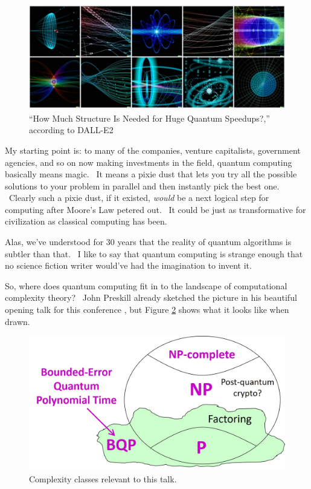 \documentclass[11pt]{article}
\begin{document}
\begin{figure}
\includegraphics[width=6.5in]{dalle.jpg}
\caption{``How Much Structure Is Needed for Huge Quantum Speedups?,'' according to DALL-E2}
\label{dalle}
\end{figure}

My starting point is: to many of the companies, venture capitalists, government agencies, and so on now making investments in the field, quantum computing basically means magic. \ It means a pixie dust that lets you try all the possible solutions to your problem in parallel and then instantly pick the best one. \ Clearly such a pixie dust, if it existed, \emph{would} be a next logical step for computing after Moore's Law petered out. \ It could be just as transformative for civilization as classical computing has been.

Alas, we've understood for 30 years that the reality of quantum algorithms is subtler than that. \ I like to say that quantum computing is strange enough that no science fiction writer would've had the imagination to invent it.

So, where does quantum computing fit in to the landscape of computational complexity theory? \ John Preskill already sketched the picture in his beautiful opening talk for this conference \cite{preskill:solvay}, but Figure \ref{classes} shows what it looks like when drawn.

\begin{figure}
\includegraphics[width=6.5in]{classes.jpg}
\caption{Complexity classes relevant to this talk.}
\label{classes}
\end{figure}
\end{document}
